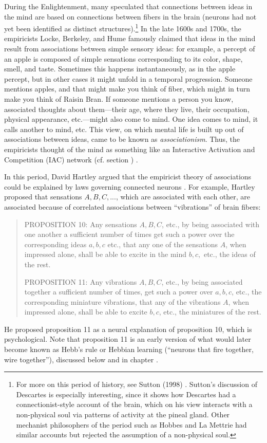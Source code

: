 During the Enlightenment, many speculated that connections between ideas in the mind are based on connections between fibers in the brain (neurons had not yet been identified as distinct structures).\footnote{For more on this period of history, see Sutton (1998) \cite{sutton1998philosophy}. Sutton's discussion of Descartes is especially interesting, since it shows how Descartes had a connectionist-style account of the brain, which on his view  interacts with a non-physical soul via patterns of activity at the pineal gland. Other mechanist philosophers of the period such as Hobbes and La Mettrie had similar accounts but rejected the assumption of a non-physical soul.} In the late 1600s and 1700s, the empiricists Locke, Berkeley, and Hume famously claimed that ideas in the mind result from associations between simple sensory ideas: for example, a percept of an apple is composed of simple sensations corresponding to its color, shape, smell, and taste. Sometimes this happens instantaneously, as in the apple percept, but in other cases it might unfold in a temporal progression. Someone mentions apples, and that might make you think of fiber, which might in turn make you think of Raisin Bran. If someone mentions a person you know, associated thoughts about them---their age, where they live, their occupation, physical appearance, etc.---might also come to mind. One idea comes to mind, it calls another to mind, etc. This view, on which mental life is built up out of associations between ideas, came to be known as \emph{associationism}. Thus, the empiricists thought of the mind as something like an Interactive Activation and Competition (IAC) network (cf. section ) \cite{bain1873mind}.

In this period, David Hartley argued that the empiricist theory of associations could be explained by laws governing connected neurons \cite{hartley1749observations, bain1873mind}. For example, Hartley \cite{hartley1749observations} proposed that sensations $A,B,C,...$, which are associated with each other, are associated because of correlated associations between ``vibrations'' of brain fibers:
\begin{quotation}
PROPOSITION 10: Any sensations $A, B, C$, etc., by being associated with one another a sufficient number of times get such a  power over the corresponding ideas $a, b, c$ etc., that any one of the sensations $A$, when impressed alone, shall be able to excite in the mind $b, c,$ etc., the ideas of the rest.

PROPOSITION 11: Any vibrations $A, B, C$, etc., by being associated together a sufficient number of times, get such a power over $a, b, c$, etc., the corresponding miniature vibrations, that any of the vibrations $A$, when impressed alone, shall be able to excite $b, c$, etc., the miniatures of the rest.
\end{quotation}
He proposed proposition 11 as a neural explanation of proposition 10, which is psychological. Note that proposition 11 is an early version of what would later become known as Hebb's rule or Hebbian learning (``neurons that fire together, wire together''), discussed below and in chapter .

